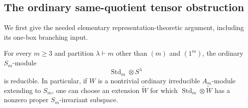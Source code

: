 \subsection*{The ordinary same-quotient tensor obstruction}

We first give the needed elementary representation-theoretic
argument, including its one-box branching input.

\begin{lemma}
For every \(m\ge3\) and partition \(\lambda\vdash m\) other than
\((m)\) and \((1^m)\), the ordinary \(S_m\)-module
\[
                         \operatorname{Std}_m\otimes S^\lambda
 \tag{SQK.5}
\]
is reducible.  In particular, if \(W\) is a nontrivial ordinary
irreducible \(A_m\)-module extending to \(S_m\), one can choose an
extension \(\widetilde W\) for which
\(\operatorname{Std}_m\otimes\widetilde W\) has a nonzero proper
\(S_m\)-invariant subspace.
\end{lemma}

